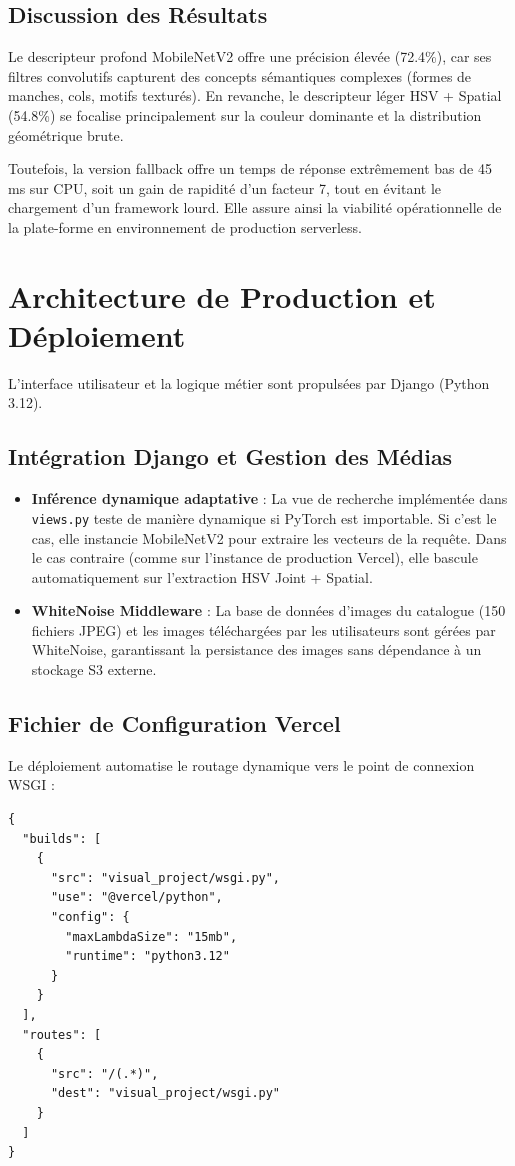 \documentclass[12pt,a4paper]{article}
\begin{document}
\subsection{Discussion des Résultats}
Le descripteur profond MobileNetV2 offre une précision élevée (72.4\%), car ses filtres convolutifs capturent des concepts sémantiques complexes (formes de manches, cols, motifs texturés). En revanche, le descripteur léger HSV + Spatial (54.8\%) se focalise principalement sur la couleur dominante et la distribution géométrique brute. 

Toutefois, la version fallback offre un temps de réponse extrêmement bas de 45 ms sur CPU, soit un gain de rapidité d'un facteur 7, tout en évitant le chargement d'un framework lourd. Elle assure ainsi la viabilité opérationnelle de la plate-forme en environnement de production serverless.

\section{Architecture de Production et Déploiement}
L'interface utilisateur et la logique métier sont propulsées par Django (Python 3.12).

\subsection{Intégration Django et Gestion des Médias}
\begin{itemize}
    \item \textbf{Inférence dynamique adaptative} : La vue de recherche implémentée dans \texttt{views.py} teste de manière dynamique si PyTorch est importable. Si c'est le cas, elle instancie MobileNetV2 pour extraire les vecteurs de la requête. Dans le cas contraire (comme sur l'instance de production Vercel), elle bascule automatiquement sur l'extraction HSV Joint + Spatial.
    \item \textbf{WhiteNoise Middleware} : La base de données d'images du catalogue (150 fichiers JPEG) et les images téléchargées par les utilisateurs sont gérées par WhiteNoise, garantissant la persistance des images sans dépendance à un stockage S3 externe.
\end{itemize}

\subsection{Fichier de Configuration Vercel}
Le déploiement automatise le routage dynamique vers le point de connexion WSGI :
\begin{lstlisting}[language={}, caption=Fichier vercel.json de l'application Visual Search]
{
  "builds": [
    {
      "src": "visual_project/wsgi.py",
      "use": "@vercel/python",
      "config": {
        "maxLambdaSize": "15mb",
        "runtime": "python3.12"
      }
    }
  ],
  "routes": [
    {
      "src": "/(.*)",
      "dest": "visual_project/wsgi.py"
    }
  ]
}
\end{lstlisting}
\end{document}
